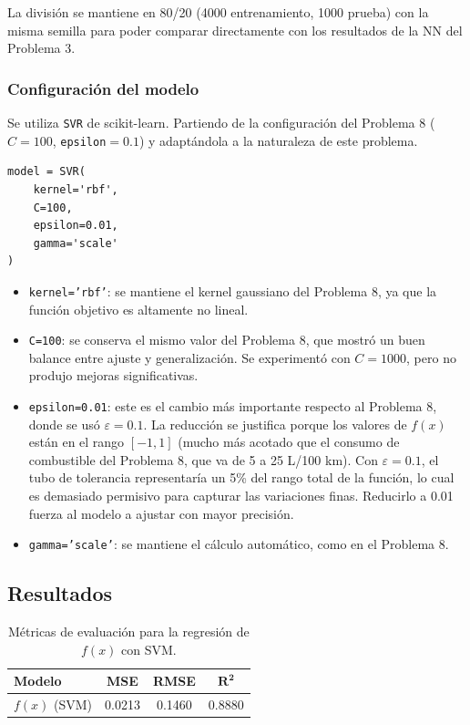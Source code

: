 \documentclass{article}
\begin{document}
La división se mantiene en 80/20 (4000 entrenamiento, 1000 prueba) con la misma semilla para poder comparar directamente con los resultados de la NN del Problema 3.

\subsubsection{Configuración del modelo}

Se utiliza \texttt{SVR} de scikit-learn. Partiendo de la configuración del Problema 8 ($C=100$, \texttt{epsilon}$=0.1$) y adaptándola a la naturaleza de este problema.

\begin{lstlisting}
model = SVR(
    kernel='rbf',
    C=100,
    epsilon=0.01,
    gamma='scale'
)
\end{lstlisting}

\begin{itemize}
    \item \texttt{kernel='rbf'}: se mantiene el kernel gaussiano del Problema 8, ya que la función objetivo es altamente no lineal.
    \item \texttt{C=100}: se conserva el mismo valor del Problema 8, que mostró un buen balance entre ajuste y generalización. Se experimentó con $C=1000$, pero no produjo mejoras significativas.
    \item \texttt{epsilon=0.01}: este es el cambio más importante respecto al Problema 8, donde se usó $\varepsilon = 0.1$. La reducción se justifica porque los valores de $f(x)$ están en el rango $[-1, 1]$ (mucho más acotado que el consumo de combustible del Problema 8, que va de 5 a 25 L/100 km). Con $\varepsilon = 0.1$, el tubo de tolerancia representaría un 5\% del rango total de la función, lo cual es demasiado permisivo para capturar las variaciones finas. Reducirlo a 0.01 fuerza al modelo a ajustar con mayor precisión.
    \item \texttt{gamma='scale'}: se mantiene el cálculo automático, como en el Problema 8.
\end{itemize}

\subsection{Resultados}

\begin{table}[H]
\centering
\begin{tabular}{lccc}
\hline
\textbf{Modelo} & \textbf{MSE} & \textbf{RMSE} & $\mathbf{R^2}$ \\
\hline
$f(x)$ (SVM) & 0.0213 & 0.1460 & 0.8880 \\
\hline
\end{tabular}
\caption{Métricas de evaluación para la regresión de $f(x)$ con SVM.}
\label{tab:p9_resultados}
\end{table}
\end{document}
